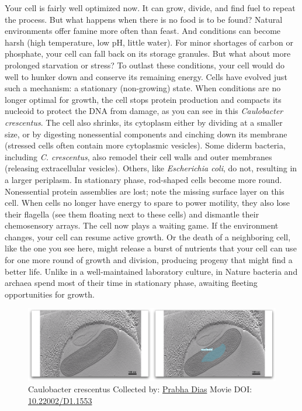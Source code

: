 \documentclass[]{tufte-book}
\begin{document}
Your cell is fairly well optimized now. It can grow, divide, and find
fuel to repeat the process. But what happens when there is no food is to
be found? Natural environments offer famine more often than feast. And
conditions can become harsh (high temperature, low pH, little water).
For minor shortages of carbon or phosphate, your cell can fall back on
its storage granules. But what about more prolonged starvation or
stress? To outlast these conditions, your cell would do well to hunker
down and conserve its remaining energy. Cells have evolved just such a
mechanism: a stationary (non-growing) state. When conditions are no
longer optimal for growth, the cell stops protein production and
compacts its nucleoid to protect the DNA from damage, as you can see in
this \emph{Caulobacter crescentus}. The cell also shrinks, its cytoplasm
either by dividing at a smaller size, or by digesting nonessential
components and cinching down its membrane (stressed cells often contain
more cytoplasmic vesicles). Some diderm bacteria, including \emph{C.
crescentus}, also remodel their cell walls and outer membranes
(releasing extracellular vesicles). Others, like \emph{Escherichia
coli}, do not, resulting in a larger periplasm. In stationary phase,
rod-shaped cells become more round. Nonessential protein assemblies are
lost; note the missing surface layer on this cell. When cells no longer
have energy to spare to power motility, they also lose their flagella
(see them floating next to these cells) and dismantle their chemosensory
arrays. The cell now plays a waiting game. If the environment changes,
your cell can resume active growth. Or the death of a neighboring cell,
like the one you see here, might release a burst of nutrients that your
cell can use for one more round of growth and division, producing
progeny that might find a better life. Unlike in a well-maintained
laboratory culture, in Nature bacteria and archaea spend most of their
time in stationary phase, awaiting fleeting opportunities for growth.





\begin{figure}
\includegraphics{movie_stills/8_1} \caption[Caulobacter crescentus Collected by:
\protect\hyperlink{prabha_dias}{Prabha Dias} Movie DOI:
\href{https://doi.org/10.22002/D1.1553}{10.22002/D1.1553}]{Caulobacter crescentus Collected by:
\protect\hyperlink{prabha_dias}{Prabha Dias} Movie DOI:
\href{https://doi.org/10.22002/D1.1553}{10.22002/D1.1553}}\label{fig:8-1}
\end{figure}
\end{document}
